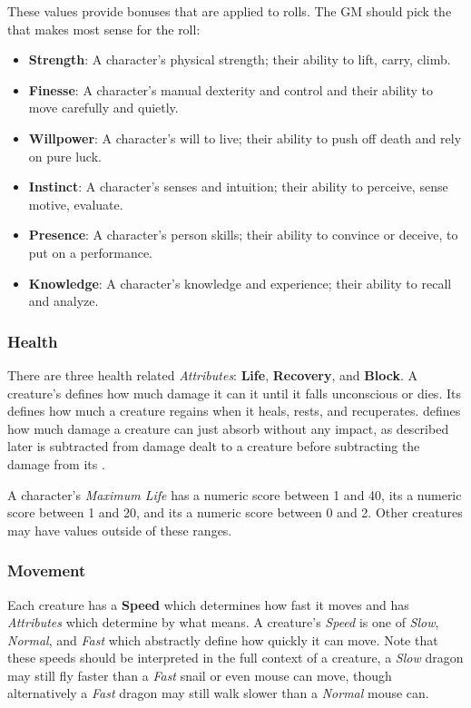 These \Attribute{} values provide bonuses that are applied to rolls.
The GM should pick the \Attribute{} that makes most sense for the roll:
\begin{itemize}
  \item \textbf{Strength}: A character's physical strength; their ability to lift, carry, climb.
  \item \textbf{Finesse}: A character's manual dexterity and control and their ability to move carefully and quietly.
  \item \textbf{Willpower}: A character's will to live; their ability to push off death and rely on pure luck.
  \item \textbf{Instinct}: A character's senses and intuition; their ability to perceive, sense motive, evaluate.
  \item \textbf{Presence}: A character's person skills; their ability to convince or deceive, to put on a performance.
  \item \textbf{Knowledge}: A character's knowledge and experience; their ability to recall and analyze.
\end{itemize}

\subsubsection{Health}
There are three health related \emph{Attributes}: \textbf{Life}, \textbf{Recovery}, and \textbf{Block}.
A creature's \Life{} defines how much damage it can it until it falls unconscious or dies.
Its \Recovery{} defines how much \Life{} a creature regains when it heals, rests, and recuperates.
\Block{} defines how much damage a creature can just absorb without any impact, as described later \Block{} is subtracted from damage dealt to a creature before subtracting the damage from its \Life.

A character's \emph{Maximum Life} has a numeric score between 1 and 40, its \Recovery{} a numeric score between 1 and 20, and its \Block{} a numeric score between 0 and 2.
Other creatures may have values outside of these ranges.

\subsubsection{Movement}
Each creature has a \textbf{Speed} which determines how fast it moves and has \emph{Attributes} which determine by what means.
A creature's \emph{Speed} is one of \emph{Slow}, \emph{Normal}, and \emph{Fast} which abstractly define how quickly it can move.
Note that these speeds should be interpreted in the full context of a creature, a \emph{Slow} dragon may still fly faster than a \emph{Fast} snail or even mouse can move, though alternatively a \emph{Fast} dragon may still walk slower than a \emph{Normal} mouse can.

